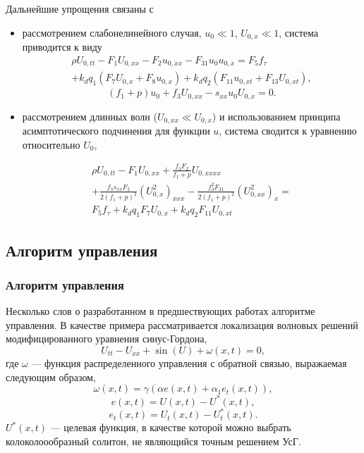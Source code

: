 \begin{frame}
	Дальнейшие упрощения связаны с
	\begin{itemize} 
		\item рассмотрением слабонелинейного случая, $u_0 \ll 1$, $U_{0, x} \ll 1$, система приводится к виду
	\begin{multline}
		\rho U_{0,tt}- F_1 U_{0,xx}- F_2 u_{0,xx}-F_{31} u_0 u_{0,x}=F_5 f_\tau\\
		+k_d q_1 (F_7 U_{0,x}+F_8 u_{0,x})+ k_d q_2 (F_{11} u_{0,xt}+ F_{13} U_{0,xt}),
	\end{multline}
	\begin{equation}
		(f_1+p)u_0+f_3 U_{0,xx}-s_{xx} u_0 U_{0,x}=0.
	\end{equation}
		\item рассмотрением длинных волн ($U_{0, xx} \ll U_{0, x}$) и использованием принципа асимптотического подчинения для функции $u$, система сводится к уравнению относительно $U_0$,
		\begin{small}
		\begin{multline}
		\rho U_{0,tt}- F_1 U_{0,xx}+ \frac{f_3 F_2}{f_1+p}U_{0,xxxx}\\+\frac{f_3 s_{xx} F_{2}}{2(f_1+p)^2} (U_{0,x}^2)_{xxx}
		-\frac{f_3^2 F_{31}}{2(f_1+p)^2} (U_{0,xx}^2)_{x}=\\
			F_5 f_\tau+k_d q_1 F_7 U_{0,x} + k_d q_2 F_{11}U _{0,xt}
		\end{multline}
		\end{small}
	\end{itemize}

\end{frame}


\subsection{Алгоритм управления}

\begin{frame}
\frametitle{Алгоритм управления}

Несколько слов о разработанном в предшествующих работах алгоритме управления. В качестве примера рассматривается локализация волновых решений модифицированного уравнения синус-Гордона,
$$
	U_{tt}-U_{xx}+\sin(U)+\omega(x,t)=0,
$$
где $\omega$ --- функция распределенного управления с обратной связью, выражаемая следующим образом,
$$
\omega(x,t)=\gamma \left(\alpha e(x,t)+\alpha_1 e_t(x,t)\right),
$$
$$
e(x,t)=U(x,t)-U^*(x,t),
$$
$$
e_t(x,t)=U_t(x,t)-U^*_t(x,t).
$$
$U^*(x,t)$ --- целевая функция, в качестве которой можно выбрать колоколоообразный солитон, не являющийся точным решением УсГ.
\end{frame}

